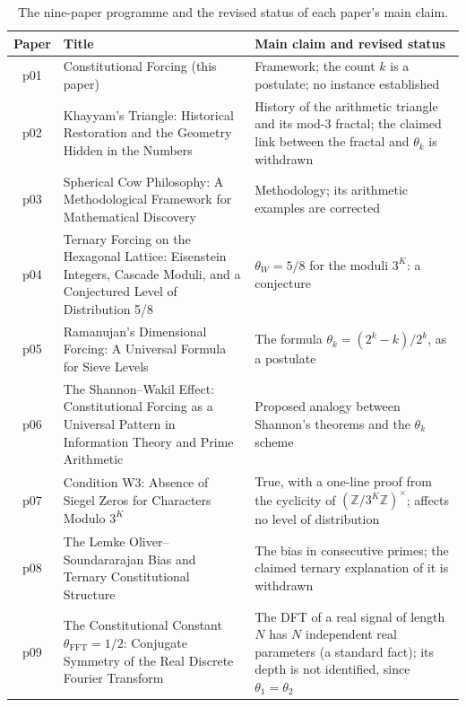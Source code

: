 \documentclass[12pt]{amsart}
\theoremstyle{plain}
\theoremstyle{definition}
\theoremstyle{remark}
\newcommand{\Z}{\mathbb{Z}}
\newcommand{\thetak}{\theta_k}
\begin{document}
\begin{table}[h]
\centering
\small
\caption{The nine-paper programme and the revised status of each paper's
  main claim.}
\label{tab:program}
\begin{tabular}{c >{\raggedright\arraybackslash}p{5.9cm}
                  >{\raggedright\arraybackslash}p{6.6cm}}
\toprule
Paper & Title & Main claim and revised status \\
\midrule
p01 & Constitutional Forcing (this paper)
    & Framework; the count $k$ is a postulate; no instance established
    \\[2pt]
p02 & Khayyam's Triangle: Historical Restoration and the Geometry Hidden in
      the Numbers~\cite{WakilKhayyam}
    & History of the arithmetic triangle and its mod-$3$ fractal; the claimed
      link between the fractal and $\thetak$ is withdrawn \\[2pt]
p03 & Spherical Cow Philosophy: A Methodological Framework for Mathematical
      Discovery~\cite{WakilSC}
    & Methodology; its arithmetic examples are corrected \\[2pt]
p04 & Ternary Forcing on the Hexagonal Lattice: Eisenstein Integers, Cascade
      Moduli, and a Conjectured Level of Distribution
      5/8~\cite{WakilEisenstein}
    & $\theta_W = 5/8$ for the moduli $3^K$: a conjecture \\[2pt]
p05 & Ramanujan's Dimensional Forcing: A Universal Formula for Sieve
      Levels~\cite{WakilRamanujan}
    & The formula $\thetak = (2^k - k)/2^k$, as a postulate \\[2pt]
p06 & The Shannon--Wakil Effect: Constitutional Forcing as a Universal
      Pattern in Information Theory and Prime Arithmetic~\cite{WakilShannon}
    & Proposed analogy between Shannon's theorems and the $\thetak$ scheme
      \\[2pt]
p07 & Condition W3: Absence of Siegel Zeros for Characters Modulo
      $3^K$~\cite{WakilW3}
    & True, with a one-line proof from the cyclicity of
      $(\Z/3^K\Z)^\times$; affects no level of distribution \\[2pt]
p08 & The Lemke Oliver--Soundararajan Bias and Ternary Constitutional
      Structure~\cite{WakilBias}
    & The bias in consecutive primes; the claimed ternary explanation of it is
      withdrawn \\[2pt]
p09 & The Constitutional Constant $\theta_{\mathrm{FFT}} = 1/2$: Conjugate
      Symmetry of the Real Discrete Fourier Transform~\cite{WakilFFT}
    & The DFT of a real signal of length $N$ has $N$ independent real
      parameters (a standard fact); its depth is not identified, since
      $\theta_1 = \theta_2$ \\
\bottomrule
\end{tabular}
\end{table}
\end{document}
